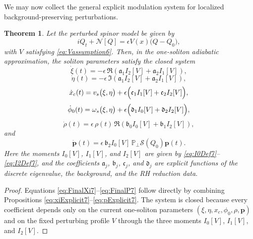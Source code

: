 \documentclass[11pt]{amsart}
\newtheorem{theorem}{Theorem}[section]
\theoremstyle{definition}
\numberwithin{equation}{section}
\begin{document}
We may now collect the general explicit modulation system for localized background-preserving perturbations.

\begin{theorem}
\label{thm_8_2}
Let the perturbed spinor model be given by
\begin{equation}
iQ_t+\mathcal N[Q]=\epsilon V(x)\bigl(Q-Q_0\bigr),
\label{eq:MainPerturbedEquation7}
\end{equation}
with \(V\) satisfying \eqref{eq:Vassumption6}. Then, in the one-soliton adiabatic approximation, the soliton parameters satisfy the closed system
\begin{equation}
\dot{\xi}(t)
=
-\epsilon\,
\Re\!\left(
\mathfrak{a}_1 I_2[V] + \mathfrak{a}_2 I_1[V]
\right),
\label{eq:FinalXi7}
\end{equation}
\begin{equation}
\dot{\eta}(t)
=
-\epsilon\,
\Im\!\left(
\mathfrak{a}_1 I_2[V] + \mathfrak{a}_2 I_1[V]
\right),
\label{eq:FinalEta7}
\end{equation}
\begin{equation}
\dot{x}_c(t)
=
v_s\bigl(\xi,\eta\bigr)
+
\epsilon\Bigl(
\mathfrak{c}_1 I_1[V]
+
\mathfrak{c}_2 I_2[V]
\Bigr),
\label{eq:FinalXc7}
\end{equation}
\begin{equation}
\dot{\phi}_0(t)
=
\omega_s\bigl(\xi,\eta\bigr)
+
\epsilon\Bigl(
\mathfrak{d}_1 I_0[V]
+
\mathfrak{d}_2 I_2[V]
\Bigr),
\label{eq:FinalPhi7}
\end{equation}
\begin{equation}
\dot{\rho}(t)
=
\epsilon\,\rho(t)\,
\Re\!\left(
\mathfrak{b}_0 I_0[V]
+
\mathfrak{b}_1 I_2[V]
\right),
\label{eq:FinalRho7}
\end{equation}
and
\begin{equation}
\dot{\mathbf p}(t)
=
\epsilon\,\mathfrak{b}_2 I_0[V]\,
\mathbb P_\perp \mathcal S(Q_0)\mathbf p(t).
\label{eq:FinalP7}
\end{equation}
Here the moments \(I_0[V]\), \(I_1[V]\), and \(I_2[V]\) are given by \eqref{eq:I0Def7}--\eqref{eq:I2Def7}, and the coefficients \(\mathfrak a_j\), \(\mathfrak b_j\), \(\mathfrak c_j\), and \(\mathfrak d_j\) are explicit functions of the discrete eigenvalue, the background, and the RH reduction data.
\end{theorem}

\begin{proof}
Equations \eqref{eq:FinalXi7}--\eqref{eq:FinalP7} follow directly by combining Propositions \eqref{eq:xiExplicit7}--\eqref{eq:pExplicit7}. The system is closed because every coefficient depends only on the current one-soliton parameters \((\xi,\eta,x_c,\phi_0,\rho,\mathbf p)\) and on the fixed perturbing profile \(V\) through the three moments \(I_0[V]\), \(I_1[V]\), and \(I_2[V]\).
\end{proof}
\end{document}
